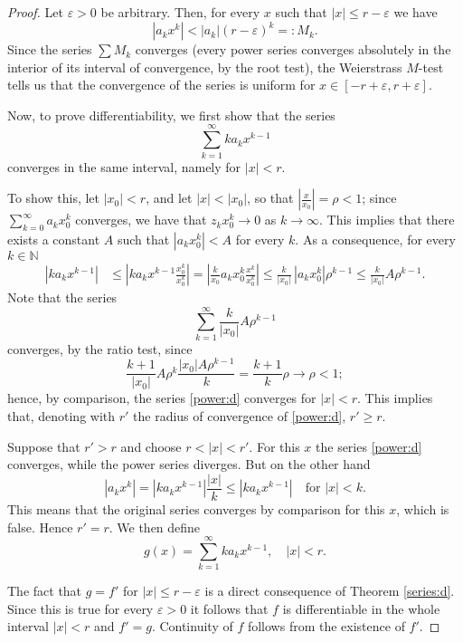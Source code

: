 \documentclass[a4paper,reqno]{amsart}
\numberwithin{equation}{section}
\def\N{\mathbb{N}}
\begin{document}
\begin{proof}
Let $\varepsilon>0$ be arbitrary. Then, for every $x$ such that $|x|\leq r-\varepsilon$ we have
$$
|a_k x^k|<|a_k|(r-\varepsilon)^k=: M_k.
$$
Since the series $\sum M_k$ converges (every power series converges absolutely in the interior of its interval of convergence, by the root test), the Weierstrass $M$-test tells us that the convergence of the series is uniform for $x\in [-r+\varepsilon,r+\varepsilon]$. 

Now, to prove differentiability, we first show that the series 
\begin{equation}\label{power:d}
\sum_{k=1}^\infty k a_k x^{k-1}
\end{equation}
converges in the same interval, namely for $|x|<r$.

To show this, let $|x_0|<r$, and let $|x|<|x_0|$, so that $\left|\frac{x}{x_0}\right|=\rho<1$; since $\sum_{k=0}^\infty a_k x_0^k$ converges, we have that 
$z_k x_0^k\to 0$ as $k\to \infty$. This implies that there exists a constant $A$ such that $|a_kx_0^k|<A$ for every $k$. As a consequence, for every $k\in \N$
\begin{align*}
|k a_k x^{k-1}| & \leq \left| k a_k x^{k-1} \frac{x_0^k}{x_0^k}\right| = \left|\frac{k}{x_0} a_k x_0^k \frac{x^k}{x_0^k}\right|\leq \frac{k}{|x_0|}\, |a_kx_0^k| \rho^{k-1} \leq \frac{k}{|x_0|} A \rho^{k-1}.
\end{align*}
Note that the series 
$$
\sum_{k=1}^\infty \frac{k}{|x_0|} A \rho^{k-1}
$$
converges, by the ratio test, since 
$$
\frac{k+1}{|x_0|} A \rho^{k} \frac{|x_0| A \rho^{k-1}}{k} = \frac{k+1}{k} \rho \to \rho <1;
$$
hence, by comparison, the series \eqref{power:d} converges for $|x|<r$. This implies that, denoting with $r'$ the radius of convergence of \eqref{power:d}, $r'\geq r$.

Suppose that $r'>r$ and choose $r<|x|<r'$. For this $x$ the series \eqref{power:d} converges, while the power series diverges. But on the other hand 
$$
|a_k x^k| = |k a_k x^{k-1}| \frac{|x|}k \leq |k a_k x^{k-1}| \quad \textrm{for } |x|<k.
$$
This means that the original series converges by comparison for this $x$, which is false. Hence $r'=r$. 
\medskip
We then define 
$$
g(x) = \sum_{k=1}^\infty k a_k x^{k-1}, \quad |x|<r.
$$

The fact that $g = f'$ for $|x|\leq r-\varepsilon$ is a direct consequence of Theorem \ref{series:d}. Since this is true for every $\varepsilon>0$ it follows that $f$ is differentiable in the whole interval $|x|<r$ and $f'=g$. 
Continuity of $f$ follows from the existence of $f'$. 
\end{proof}
\end{document}
